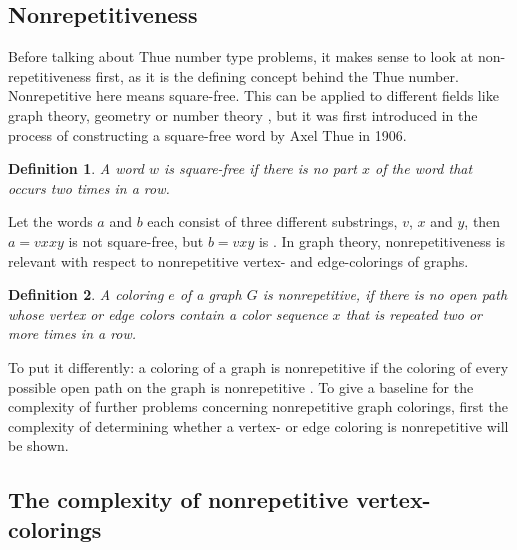 \documentclass[12pt,a4paper]{article}
\newtheorem{definition}{Definition}
\begin{document}
\subsection{Nonrepetitiveness}
Before talking about Thue number type problems, it makes sense to look at non-repetitiveness first, as it is the defining concept behind the  Thue number. Nonrepetitive here means square-free. This can be applied to different fields like graph theory, geometry or number theory \citep{Grytczuk2008}, but it was first introduced in the process of constructing a square-free word by Axel Thue in 1906. 
\begin{definition} 
A word $w$ is square-free if there is no part $x$ of the word that occurs two times in a row.
\end{definition} 
Let the words $a$ and $b$ each consist of three different substrings, $v$, $x$ and $y$, then $a = vxxy$ is not square-free, but $b = vxy$ is \citep{Thue1906}.
\newline
In graph theory, nonrepetitiveness is relevant with respect to nonrepetitive vertex- \citep{Marx2009} and edge-colorings of graphs. 
\begin{definition} 
A coloring $e$ of a graph $G$ is nonrepetitive, if there is no open path whose vertex or edge colors contain a color sequence $x$ that is repeated two or more times in a row.
\end{definition} 
To put it differently: a coloring of a graph is nonrepetitive if the coloring of every possible open path on the graph is nonrepetitive \citep{Alon2002}. To give a baseline for the complexity of further problems concerning nonrepetitive graph colorings, first the complexity of determining whether a vertex- or edge coloring is nonrepetitive will be shown.

\subsection{The complexity of nonrepetitive vertex-colorings}
\end{document}
